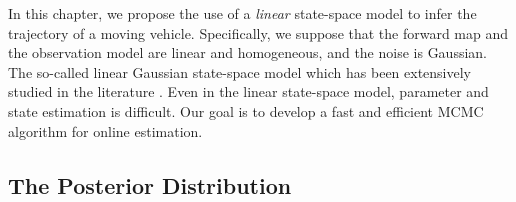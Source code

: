 In this chapter, we propose the use of a \textit{linear} state-space model to infer the trajectory of a moving vehicle. Specifically, we suppose that the forward map and the observation model are linear and homogeneous, and the noise is Gaussian. The so-called linear Gaussian state-space model which has been extensively studied in the literature \citep{durbin2012time}. Even in the linear state-space model, parameter and state estimation is difficult. Our goal is to develop a fast and efficient MCMC algorithm for online estimation. 




\subsection{The Posterior Distribution}\label{sectionlogParameter}

